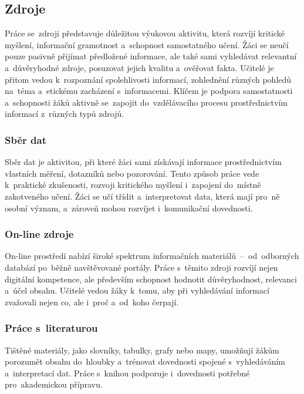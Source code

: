 \documentclass[male,czech,api_bc]{kitheses}
\begin{document}
\subsection{Zdroje}

Práce se~zdroji představuje důležitou výukovou aktivitu, která rozvíjí kritické myšlení, informační gramotnost a~schopnost samostatného učení. Žáci se neučí pouze pasivně přijímat předložené informace, ale také sami vyhledávat relevantní a~důvěryhodné zdroje, posuzovat jejich kvalitu a~ověřovat fakta. Učitelé je přitom vedou k~rozpoznání spolehlivosti informací, zohlednění různých pohledů na~téma a~etickému zacházení s~informacemi. Klíčem je podpora samostatnosti a~schopnosti žáků aktivně se~zapojit do~vzdělávacího procesu prostřednictvím informací z~různých typů zdrojů.

\subsubsection{Sběr dat}

Sběr dat je aktivitou, při které žáci sami získávají informace prostřednictvím vlastních měření, dotazníků nebo pozorování. Tento způsob práce vede k~praktické zkušenosti, rozvoji kritického myšlení i~zapojení do~místně zakotveného učení. Žáci se učí třídit a~interpretovat data, která mají pro~ně osobní význam, a~zároveň mohou rozvíjet i~komunikační dovednosti.

\subsubsection{On-line zdroje}

On-line prostředí nabízí široké spektrum informačních materiálů~--~od~odborných databází po~běžně navštěvované portály. Práce s~těmito zdroji rozvíjí nejen digitální kompetence, ale především schopnost hodnotit důvěryhodnost, relevanci a~účel obsahu. Učitelé vedou žáky k~tomu, aby při vyhledávání informací zvažovali nejen co, ale i~proč a~od~koho čerpají.

\subsubsection{Práce s~literaturou}

Tištěné materiály, jako slovníky, tabulky, grafy nebo mapy, umožňují žákům porozumět obsahu do~hloubky a~trénovat dovednosti spojené s~vyhledáváním a~interpretací dat. Práce s~knihou podporuje i~dovednosti potřebné pro~akademickou přípravu.
\end{document}

